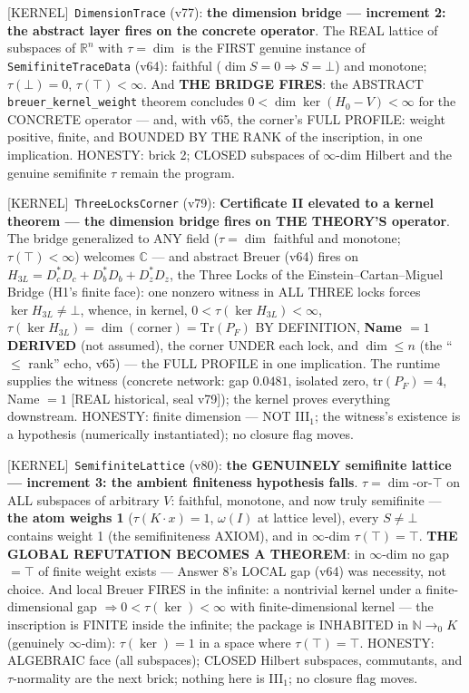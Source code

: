 \documentclass[11pt]{article}
\providecommand{\kernelmk}[1]{\textsf{[KERNEL]}~\texttt{#1}}\providecommand{\knownmk}[1]{\textsf{[KNOWN]}~{#1}}\providecommand{\statusmk}[1]{\textsf{[#1]}}
\theoremstyle{definition}\newtheorem{deriv}{Derivation}
\begin{document}
\kernelmk{DimensionTrace} (v77): \textbf{the dimension bridge --- increment 2: the abstract layer fires on the concrete operator}. The REAL lattice of subspaces of $\mathbb R^n$ with $\tau=\dim$ is the FIRST genuine instance of \texttt{SemifiniteTraceData} (v64): faithful ($\dim S=0\Rightarrow S=\bot$) and monotone; $\tau(\bot)=0$, $\tau(\top)<\infty$. And \textbf{THE BRIDGE FIRES}: the ABSTRACT \texttt{breuer\_kernel\_weight} theorem concludes $0<\dim\ker(H_0-V)<\infty$ for the CONCRETE operator --- and, with v65, the corner's FULL PROFILE: weight positive, finite, and BOUNDED BY THE RANK of the inscription, in one implication. HONESTY: brick 2; CLOSED subspaces of $\infty$-dim Hilbert and the genuine semifinite $\tau$ remain the program.

\kernelmk{ThreeLocksCorner} (v79): \textbf{Certificate II elevated to a kernel theorem --- the dimension bridge fires on THE THEORY'S operator}. The bridge generalized to ANY field ($\tau=\dim$ faithful and monotone; $\tau(\top)<\infty$) welcomes $\mathbb C$ --- and abstract Breuer (v64) fires on $H_{3L}=D_c^*D_c+D_b^*D_b+D_z^*D_z$, the Three Locks of the Einstein--Cartan--Miguel Bridge (H1's finite face): one nonzero witness in ALL THREE locks forces $\ker H_{3L}\neq\bot$, whence, in kernel, $0<\tau(\ker H_{3L})<\infty$, $\tau(\ker H_{3L})=\dim(\mathrm{corner})=\mathrm{Tr}(P_F)$ BY DEFINITION, \textbf{Name $=1$ DERIVED} (not assumed), the corner UNDER each lock, and $\dim\le n$ (the ``$\le$ rank'' echo, v65) --- the FULL PROFILE in one implication. The runtime supplies the witness (concrete network: gap $0.0481$, isolated zero, $\mathrm{tr}(P_F)=4$, Name $=1$ [REAL historical, seal v79]); the kernel proves everything downstream. HONESTY: finite dimension --- NOT III$_1$; the witness's existence is a hypothesis (numerically instantiated); no closure flag moves.

\kernelmk{SemifiniteLattice} (v80): \textbf{the GENUINELY semifinite lattice --- increment 3: the ambient finiteness hypothesis falls}. $\tau=\dim$-or-$\top$ on ALL subspaces of arbitrary $V$: faithful, monotone, and now truly semifinite --- \textbf{the atom weighs 1} ($\tau(K\!\cdot\!x)=1$, $\omega(I)$ at lattice level), every $S\neq\bot$ contains weight 1 (the semifiniteness AXIOM), and in $\infty$-dim $\tau(\top)=\top$. \textbf{THE GLOBAL REFUTATION BECOMES A THEOREM}: in $\infty$-dim no gap $=\top$ of finite weight exists --- Answer 8's LOCAL gap (v64) was necessity, not choice. And local Breuer FIRES in the infinite: a nontrivial kernel under a finite-dimensional gap $\Rightarrow 0<\tau(\ker)<\infty$ with finite-dimensional kernel --- the inscription is FINITE inside the infinite; the package is INHABITED in $\mathbb N\to_0 K$ (genuinely $\infty$-dim): $\tau(\ker)=1$ in a space where $\tau(\top)=\top$. HONESTY: ALGEBRAIC face (all subspaces); CLOSED Hilbert subspaces, commutants, and $\tau$-normality are the next brick; nothing here is III$_1$; no closure flag moves.
\end{document}
